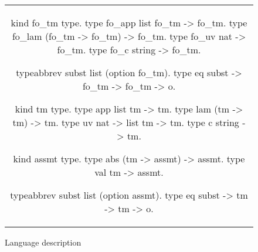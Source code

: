 \begin{figure*}
  \begin{tabular}{c}
    \begin{minipage}{.35\textwidth}

      \begin{elpicode}
        kind fo_tm type.
        type fo_app list fo_tm -> fo_tm.
        type fo_lam (fo_tm -> fo_tm) -> fo_tm.
        type fo_uv  nat -> fo_tm.
        type fo_c string -> fo_tm.



        
        
        typeabbrev subst list (option fo_tm).
        type eq subst -> fo_tm -> fo_tm -> o.
      \end{elpicode}
    \end{minipage}
    \begin{minipage}{.35\textwidth}
      
      \begin{elpicode}
        kind tm type.
        type app list tm -> tm.
        type lam (tm -> tm) -> tm.
        type uv  nat -> list tm -> tm.
        type c string -> tm.
        
        kind assmt type.
        type abs (tm -> assmt) -> assmt.
        type val tm -> assmt.
        
        typeabbrev subst list (option assmt).
        type eq subst -> tm -> tm -> o.
      \end{elpicode}
    \end{minipage}
  \end{tabular}
  
  \caption{Language description}
  \label{code:lang-descr}
\end{figure*}



